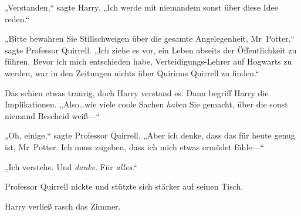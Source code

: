 „Verstanden,“ sagte Harry. „Ich werde mit niemandem sonst über diese Idee reden.“

„Bitte bewahren Sie Stillschweigen über die gesamte Angelegenheit, Mr~Potter,“ sagte Professor Quirrell. „Ich ziehe es vor, ein Leben abseits der Öffentlichkeit zu führen. Bevor ich mich entschieden habe, Verteidigungs-Lehrer auf Hogwarts zu werden, war in den Zeitungen nichts über Quirinus Quirrell zu finden.“

Das schien etwas traurig, doch Harry verstand es. Dann begriff Harry die Implikationen. „Also…wie viele coole Sachen \emph{haben} Sie gemacht, über die sonst niemand Bescheid weiß—“

„Oh, einige,“ sagte Professor Quirrell. „Aber ich denke, dass das für heute genug ist, Mr~Potter. Ich muss zugeben, dass ich mich etwas ermüdet fühle—“

„Ich verstehe. Und \emph{danke}. Für \emph{alles}.“

Professor Quirrell nickte und stützte sich stärker auf seinen Tisch.

Harry verließ rasch das Zimmer.

